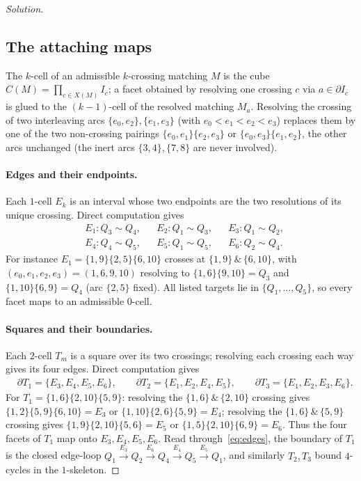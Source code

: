 \documentclass{amsart}
\theoremstyle{definition}
\newcommand{\bdy}{\partial}
\begin{document}
\begin{proof}[Solution]
\subsection{The attaching maps}\label{sec:attach}

The $k$-cell of an admissible $k$-crossing matching $M$ is the cube
$C(M)=\prod_{c\in X(M)}I_c$; a facet obtained by resolving one crossing $c$ via $a\in\bdy I_c$
is glued to the $(k-1)$-cell of the resolved matching $M_a$. Resolving the crossing of two
interleaving arcs $\{e_0,e_2\},\{e_1,e_3\}$ (with $e_0<e_1<e_2<e_3$) replaces them by one of
the two non-crossing pairings $\{e_0,e_1\}\{e_2,e_3\}$ or $\{e_0,e_3\}\{e_1,e_2\}$, the other
arcs unchanged (the inert arcs $\{3,4\},\{7,8\}$ are never involved).

\paragraph{Edges and their endpoints.}
Each $1$-cell $E_k$ is an interval whose two endpoints are the two resolutions of its unique
crossing. Direct computation gives
\begin{equation}\label{eq:edges}
\begin{aligned}
&E_1: Q_3\!\sim\!Q_4, && E_2: Q_1\!\sim\!Q_3, && E_3: Q_1\!\sim\!Q_2,\\
&E_4: Q_4\!\sim\!Q_5, && E_5: Q_1\!\sim\!Q_5, && E_6: Q_2\!\sim\!Q_4.
\end{aligned}
\end{equation}
For instance $E_1=\{1,9\}\{2,5\}\{6,10\}$ crosses at $\{1,9\}\,\&\,\{6,10\}$, with
$(e_0,e_1,e_2,e_3)=(1,6,9,10)$ resolving to $\{1,6\}\{9,10\}=Q_3$ and $\{1,10\}\{6,9\}=Q_4$
(arc $\{2,5\}$ fixed). All listed targets lie in $\{Q_1,\dots,Q_5\}$, so every facet maps to
an admissible $0$-cell.

\paragraph{Squares and their boundaries.}
Each $2$-cell $T_m$ is a square over its two crossings; resolving each crossing each way gives
its four edges. Direct computation gives
\begin{equation}\label{eq:faces}
\begin{aligned}
&\bdy T_1 = \{E_3,E_4,E_5,E_6\},\qquad
 \bdy T_2 = \{E_1,E_2,E_4,E_5\},\qquad
 \bdy T_3 = \{E_1,E_2,E_3,E_6\}.
\end{aligned}
\end{equation}
For $T_1=\{1,6\}\{2,10\}\{5,9\}$: resolving the $\{1,6\}\,\&\,\{2,10\}$ crossing gives
$\{1,2\}\{5,9\}\{6,10\}=E_3$ or $\{1,10\}\{2,6\}\{5,9\}=E_4$; resolving the
$\{1,6\}\,\&\,\{5,9\}$ crossing gives $\{1,9\}\{2,10\}\{5,6\}=E_5$ or
$\{1,5\}\{2,10\}\{6,9\}=E_6$. Thus the four facets of $T_1$ map onto $E_3,E_4,E_5,E_6$. Read
through~\eqref{eq:edges}, the boundary of $T_1$ is the closed edge-loop
$Q_1\xrightarrow{E_3}Q_2\xrightarrow{E_6}Q_4\xrightarrow{E_4}Q_5\xrightarrow{E_5}Q_1$, and
similarly $T_2,T_3$ bound $4$-cycles in the $1$-skeleton.


\end{proof}
\end{document}
